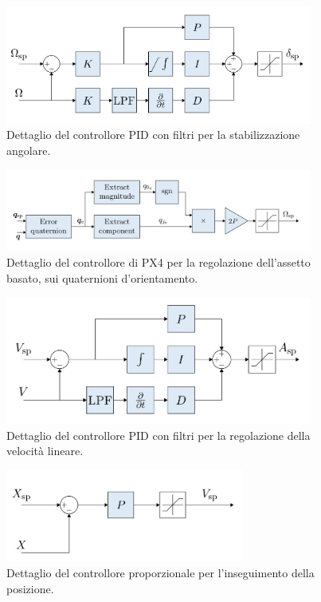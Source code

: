 \begin{figure}
    \centering
    \includegraphics[width=0.9\textwidth]{figs/chapter3/px4-angularcont.jpg}
    \caption{Dettaglio del controllore PID con filtri per la stabilizzazione angolare.}
    \label{fig:px4angular}
\end{figure}

\begin{figure}
    \centering
    \includegraphics[width=0.9\textwidth]{figs/chapter3/px4-attitude.jpg}
    \caption{Dettaglio del controllore di PX4 per la regolazione dell'assetto basato, sui quaternioni d'orientamento.}
    \label{fig:px4attitude}
\end{figure}

\begin{figure}
    \centering
    \includegraphics[width=0.9\textwidth]{figs/chapter3/px4-velocity.jpg}
    \caption{Dettaglio del controllore PID con filtri per la regolazione della velocità lineare.}
    \label{fig:px4velocity}
\end{figure}

\begin{figure}
    \centering
    \includegraphics[width=0.7\textwidth]{figs/chapter3/px4-position.jpg}
    \caption{Dettaglio del controllore proporzionale per l'inseguimento della posizione.}
    \label{fig:px4position}
\end{figure}

